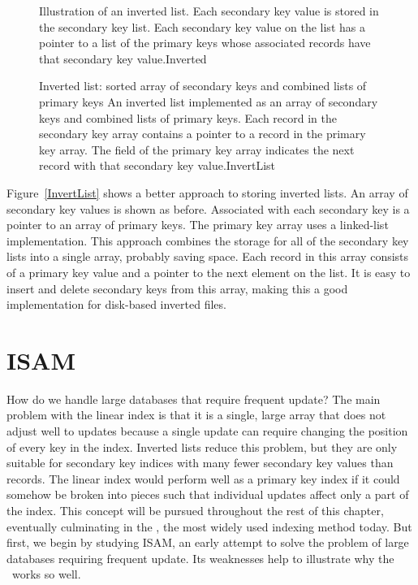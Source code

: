 \begin{figure}
\vspace{-\bigskipamount}

{Illustration of an inverted list.
Each secondary key value is stored in the secondary key list.
Each secondary key value on the list has a pointer to a list of the
primary keys whose associated records have that secondary key
value.}{Inverted}
\bigskip
\end{figure}

\begin{figure}
\vspace{-\smallskipamount}

\capt{4.5in}
{Inverted list: sorted array of secondary keys and combined lists of
primary keys}
{An inverted list implemented as an array of secondary keys and
combined lists of primary keys.
Each record in the secondary key array contains a pointer to a record
in the primary key array.
The  field of the primary key array indicates the next
record with that secondary key value.}{InvertList}
\bigskip
\end{figure}

Figure~\ref{InvertList} shows a better approach to storing inverted
lists.
An array of secondary key values is shown as before.
Associated with each secondary key is a pointer to an array of primary
keys.
The primary key array uses a linked-list implementation.
This approach combines the storage for all of the secondary key lists
into a single array, probably saving space.
Each record in this array consists of a primary key value and a
pointer to the next element on the list.
It is easy to insert and delete secondary keys from this array, making
this a good implementation for disk-based inverted files.

\section{ISAM}
\label{ISAMsec}

How do we handle large databases that require frequent update?
The main problem with the linear index is that it is a single, large
array that does not adjust well to updates because a single update can
require changing the position of every key in the index.
Inverted lists reduce this problem, but they are only suitable for
secondary key indices with many fewer secondary key values than records.
The linear index would perform well as a primary key index if it could
somehow be broken into pieces such that individual updates affect only
a part of the index.
This concept will be pursued throughout the rest of this chapter,
eventually culminating in the
\BPtree,
the most widely used indexing method today.
But first, we begin by studying ISAM, an early attempt to solve the
problem of large databases requiring frequent update.
Its weaknesses help to illustrate why the \BPtree\ works so well.

